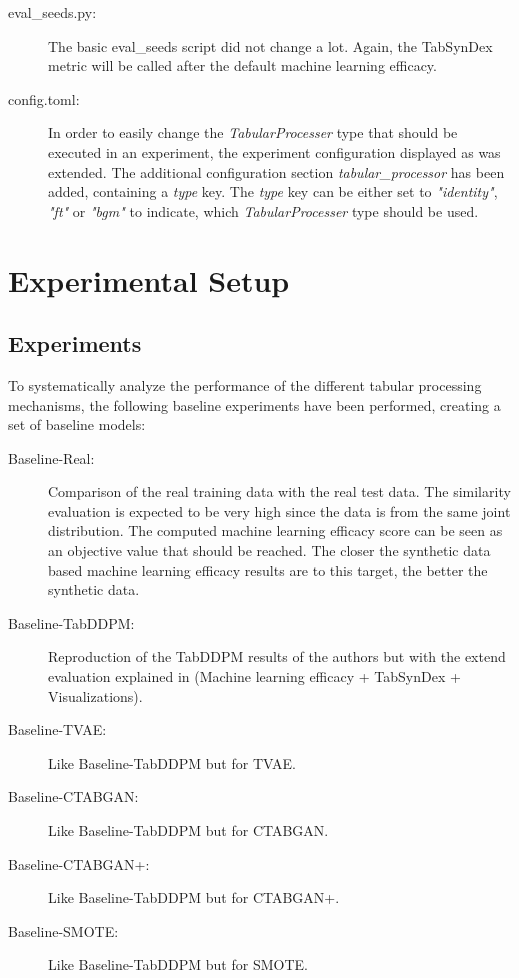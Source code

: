 \begin{description}
	\item[eval\_seeds.py:]
		The basic eval\_seeds script did not change a lot.
		Again, the TabSynDex metric will be called after the default machine learning efficacy.

	\item[config.toml:]
		In order to easily change the \textit{TabularProcesser} type that should be executed in an experiment, the experiment configuration displayed as  was extended.
		The additional configuration section \textit{tabular\_processor} has been added, containing a \textit{type} key.
		The \textit{type} key can be either set to \textit{"identity"}, \textit{"ft"} or \textit{"bgm"} to indicate, which \textit{TabularProcesser} type should be used.
\end{description}



\section{Experimental Setup}
\label{ch:methods-experimentalSetup}

\subsection{Experiments}
\label{ch:Experiments}

To systematically analyze the performance of the different tabular processing mechanisms, the following baseline experiments have been performed, creating a set of baseline models:

\begin{description}
	\item[Baseline-Real:] Comparison of the real training data with the real test data.
		The similarity evaluation is expected to be very high since the data is from the same joint distribution.
		The computed machine learning efficacy score can be seen as an objective value that should be reached.
		The closer the synthetic data based machine learning efficacy results are to this target, the better the synthetic data.
	\item[Baseline-TabDDPM:] Reproduction of the TabDDPM results of the authors \cite{kotelnikov2022TabDDPMModellingTabular} but with the extend evaluation explained in  (Machine learning efficacy + TabSynDex + Visualizations).
	\item[Baseline-TVAE:] Like Baseline-TabDDPM but for TVAE.
	\item[Baseline-CTABGAN:] Like Baseline-TabDDPM but for CTABGAN.
	\item[Baseline-CTABGAN+:] Like Baseline-TabDDPM but for CTABGAN+.
	\item[Baseline-SMOTE:] Like Baseline-TabDDPM but for SMOTE.
\end{description}


